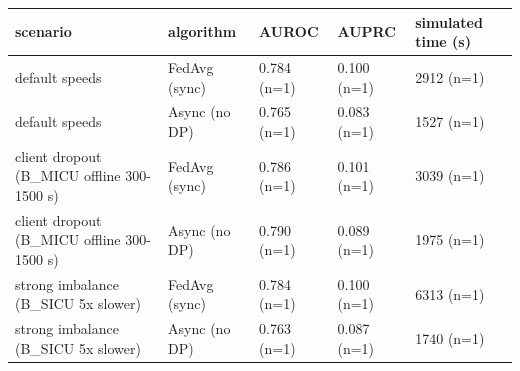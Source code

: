 \begin{tabular}{lllll}
\toprule
scenario & algorithm & AUROC & AUPRC & simulated time (s) \\
\midrule
default speeds & FedAvg (sync) & 0.784 (n=1) & 0.100 (n=1) & 2912 (n=1) \\
default speeds & Async (no DP) & 0.765 (n=1) & 0.083 (n=1) & 1527 (n=1) \\
client dropout (B\_MICU offline 300-1500 s) & FedAvg (sync) & 0.786 (n=1) & 0.101 (n=1) & 3039 (n=1) \\
client dropout (B\_MICU offline 300-1500 s) & Async (no DP) & 0.790 (n=1) & 0.089 (n=1) & 1975 (n=1) \\
strong imbalance (B\_SICU 5x slower) & FedAvg (sync) & 0.784 (n=1) & 0.100 (n=1) & 6313 (n=1) \\
strong imbalance (B\_SICU 5x slower) & Async (no DP) & 0.763 (n=1) & 0.087 (n=1) & 1740 (n=1) \\
\bottomrule
\end{tabular}
